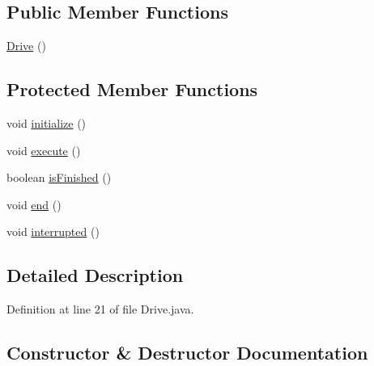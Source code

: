 \subsection*{Public Member Functions}
\begin{DoxyCompactItemize}
\item 
\mbox{\hyperlink{classorg_1_1usfirst_1_1frc3707_1_1_creedence_1_1commands_1_1_drive_a62646a2124fb67a12ef5d04f3c9d3434}{Drive}} ()
\end{DoxyCompactItemize}
\subsection*{Protected Member Functions}
\begin{DoxyCompactItemize}
\item 
void \mbox{\hyperlink{classorg_1_1usfirst_1_1frc3707_1_1_creedence_1_1commands_1_1_drive_a54d2897479817f84a56b73dc12a47e82}{initialize}} ()
\item 
void \mbox{\hyperlink{classorg_1_1usfirst_1_1frc3707_1_1_creedence_1_1commands_1_1_drive_a216bac084cbefad98fe19de3a37d5993}{execute}} ()
\item 
boolean \mbox{\hyperlink{classorg_1_1usfirst_1_1frc3707_1_1_creedence_1_1commands_1_1_drive_a533062e1e7716eeed2ec622616bba550}{is\+Finished}} ()
\item 
void \mbox{\hyperlink{classorg_1_1usfirst_1_1frc3707_1_1_creedence_1_1commands_1_1_drive_afc48ef13c07eb823dfe61d8f4f7bc044}{end}} ()
\item 
void \mbox{\hyperlink{classorg_1_1usfirst_1_1frc3707_1_1_creedence_1_1commands_1_1_drive_a072cc2de3f211279da3be2ab25e20575}{interrupted}} ()
\end{DoxyCompactItemize}


\subsection{Detailed Description}


Definition at line 21 of file Drive.\+java.



\subsection{Constructor \& Destructor Documentation}
\mbox{\label{classorg_1_1usfirst_1_1frc3707_1_1_creedence_1_1commands_1_1_drive_a62646a2124fb67a12ef5d04f3c9d3434}} 
